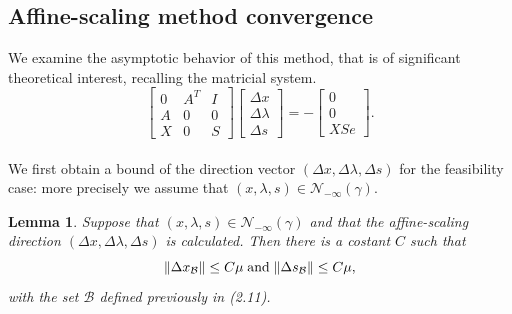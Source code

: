 \documentclass[a4paper,10 pt,titlepage,twoside]{book}
\theoremstyle{plain}
\newtheorem{lem}[thm]{Lemma}
\theoremstyle{definition}
\theoremstyle{remark}
\begin{document}
\subsection*{Affine-scaling method convergence}
We examine the asymptotic behavior of this method, that is of significant theoretical interest, recalling the matricial system.\\
\begin{equation}\label{(Q)}
\begin{bmatrix}
0&A^{T}&I \\A&0&0\\X&0&S
\end{bmatrix}\begin{bmatrix}
\Delta x\\\Delta\lambda \\\Delta s
\end{bmatrix}=-\begin{bmatrix}
0\\0\\XSe
\end{bmatrix}.
\end{equation}\\	
 We first obtain a bound of the direction vector $(\Delta x,\Delta \lambda, \Delta s)$ for the feasibility case: more precisely we assume that $(x, \lambda, s)\in\mathcal{N}_{- \infty}(\gamma)$.
\begin{lem}
Suppose that $(x, \lambda, s)\in\mathcal{N}_{- \infty}(\gamma)$ and that the affine-scaling direction $(\Delta x,\Delta \lambda, \Delta s)$ is calculated. Then there is a costant $C$ such that
\begin{equation*}
	\lVert \Delta x_{\mathcal{B}} \rVert \leq C \mu \text{\;and\;} \lVert \Delta s_\mathcal{B} \rVert \leq C \mu,
\end{equation*}
with the set $\mathcal{B}$ defined previously in (2.11). 
\end{lem}
\end{document}
